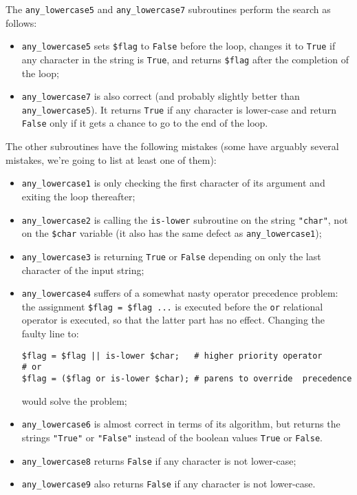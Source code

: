 The \verb'any_lowercase5' and \verb'any_lowercase7' subroutines 
perform the search as follows:

\begin{itemize} 
\item \verb'any_lowercase5' sets {\tt \$flag} 
to {\tt False} before the loop, changes it to {\tt True} if 
any character in the string is {\tt True}, and returns 
{\tt \$flag} after the completion of the loop;

\item  \verb'any_lowercase7' is also correct (and probably slightly 
better than \verb'any_lowercase5'). It returns {\tt True} if 
any character is lower-case and return {\tt False} only if 
it gets a chance to go to the end of the loop.
\end{itemize}

The other subroutines have the following mistakes (some have 
arguably several mistakes, we're going to list at least one of 
them):
\begin{itemize} 

\item \verb'any_lowercase1' is only checking the first 
character of its argument and exiting the loop thereafter;

\item \verb'any_lowercase2' is calling the {\tt is-lower} 
subroutine on the string {\tt "char"}, not on the 
{\tt \$char} variable (it also has the same defect as 
\verb'any_lowercase1');

\item \verb'any_lowercase3' is returning {\tt True} or 
{\tt False} depending on only the last character of the 
input string;

\item \verb'any_lowercase4' suffers of a somewhat nasty 
operator precedence problem: the assignment \verb'$flag = $flag ...' 
is executed before the {\tt or} relational operator is executed, 
so that the latter part has no effect. 
Changing the faulty line to:
\begin{verbatim}
$flag = $flag || is-lower $char;   # higher priority operator
# or
$flag = ($flag or is-lower $char); # parens to override  precedence
\end{verbatim}
would solve the problem;

\item \verb'any_lowercase6' is almost correct in terms of its 
algorithm, but returns the strings {\tt "True"} or 
{\tt "False"} instead of the boolean values {\tt True} or 
{\tt False}.

\item  \verb'any_lowercase8' returns {\tt False} if any 
character is not lower-case;

\item  \verb'any_lowercase9' also returns {\tt False} if any 
character is not lower-case.

\end{itemize}

